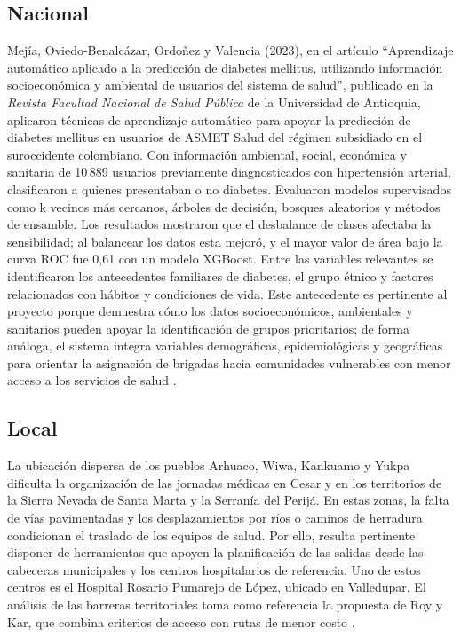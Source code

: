 \documentclass[12pt]{article}
\begin{document}
\subsection{Nacional}
Mejía, Oviedo-Benalcázar, Ordoñez y Valencia (2023), en el artículo ``Aprendizaje automático aplicado a la predicción de diabetes mellitus, utilizando información socioeconómica y ambiental de usuarios del sistema de salud'', publicado en la \textit{Revista Facultad Nacional de Salud Pública} de la Universidad de Antioquia, aplicaron técnicas de aprendizaje automático para apoyar la predicción de diabetes mellitus en usuarios de ASMET Salud del régimen subsidiado en el suroccidente colombiano. Con información ambiental, social, económica y sanitaria de 10\,889 usuarios previamente diagnosticados con hipertensión arterial, clasificaron a quienes presentaban o no diabetes. Evaluaron modelos supervisados como k vecinos más cercanos, árboles de decisión, bosques aleatorios y métodos de ensamble. Los resultados mostraron que el desbalance de clases afectaba la sensibilidad; al balancear los datos esta mejoró, y el mayor valor de área bajo la curva ROC fue 0,61 con un modelo XGBoost. Entre las variables relevantes se identificaron los antecedentes familiares de diabetes, el grupo étnico y factores relacionados con hábitos y condiciones de vida. Este antecedente es pertinente al proyecto porque demuestra cómo los datos socioeconómicos, ambientales y sanitarios pueden apoyar la identificación de grupos prioritarios; de forma análoga, el sistema integra variables demográficas, epidemiológicas y geográficas para orientar la asignación de brigadas hacia comunidades vulnerables con menor acceso a los servicios de salud \cite{ref9}.

\subsection{Local}
La ubicación dispersa de los pueblos Arhuaco, Wiwa, Kankuamo y Yukpa dificulta la organización de las jornadas médicas en Cesar y en los territorios de la Sierra Nevada de Santa Marta y la Serranía del Perijá. En estas zonas, la falta de vías pavimentadas y los desplazamientos por ríos o caminos de herradura condicionan el traslado de los equipos de salud. Por ello, resulta pertinente disponer de herramientas que apoyen la planificación de las salidas desde las cabeceras municipales y los centros hospitalarios de referencia. Uno de estos centros es el Hospital Rosario Pumarejo de López, ubicado en Valledupar. El análisis de las barreras territoriales toma como referencia la propuesta de Roy y Kar, que combina criterios de acceso con rutas de menor costo \cite{ref3}.
\end{document}

